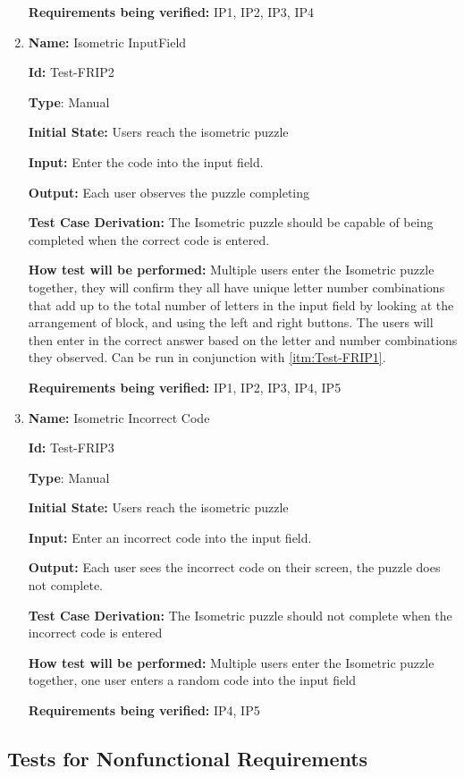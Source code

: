 \documentclass[12pt, titlepage]{article}
\begin{document}
\begin{enumerate}
\textbf{Requirements being verified: } IP1, IP2, IP3, IP4

\item{\textbf{Name:} Isometric InputField} \label{itm:Test-FRIP2}

\textbf{Id:} Test-FRIP2

\textbf{Type}: Manual

\textbf{Initial State:} Users reach the isometric puzzle

\textbf{Input:} Enter the code into the input field.

\textbf{Output:} Each user observes the puzzle completing

\textbf{Test Case Derivation:} The Isometric puzzle should be capable of being completed when the correct code is entered.

\textbf{How test will be performed:} Multiple users enter the Isometric puzzle together, they will confirm they all have unique letter number combinations that add up to the total number of letters in the input field by looking at the arrangement of block, and using the left and right buttons. The users will then enter in the correct answer based on the letter and number combinations they observed. Can be run in conjunction with \ref{itm:Test-FRIP1}.

\textbf{Requirements being verified: } IP1, IP2, IP3, IP4, IP5

\item{\textbf{Name:} Isometric Incorrect Code} \label{itm:Test-FRIP3}

\textbf{Id:} Test-FRIP3

\textbf{Type}: Manual

\textbf{Initial State:} Users reach the isometric puzzle

\textbf{Input:} Enter an incorrect code into the input field.

\textbf{Output:} Each user sees the incorrect code on their screen, the puzzle does not complete.

\textbf{Test Case Derivation:} The Isometric puzzle should not complete when the incorrect code is entered

\textbf{How test will be performed:} Multiple users enter the Isometric puzzle together, one user enters a random code into the input field

\textbf{Requirements being verified: } IP4, IP5

\end{enumerate}

\subsection{Tests for Nonfunctional Requirements}
\end{document}
